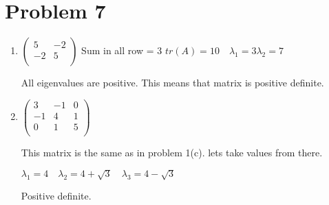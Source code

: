 \documentclass[12pt,letterpaper]{article}
\begin{document}
\section*{Problem 7}
    \begin{enumerate}[label=(\alph*)]
        \item
        $\begin{pmatrix}
            5 & -2 \\
            -2 & 5 \\
        \end{pmatrix}$
        Sum in all row = 3
        $tr(A) = 10 \quad \lambda_1 = 3 \lambda_2 = 7$
        
        All eigenvalues are positive. This means that matrix is positive definite.
        
        \item
        $\begin{pmatrix}
            3 & -1 & 0 \\
            -1 & 4 & 1 \\
            0 & 1 & 5 \\
        \end{pmatrix}$
        
        This matrix is the same as in problem 1(c). lets take values from there. 
        
        $\lambda_1 = 4 \quad \lambda_2 = 4 + \sqrt{3} \quad \lambda_3 = 4 - \sqrt{3}$
        
        Positive definite.
    \end{enumerate}
    
\end{document}
